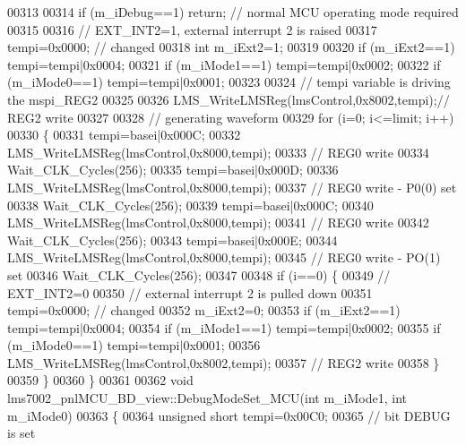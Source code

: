 \begin{DoxyCode}
{{{{{{{00313 
00314     \textcolor{keywordflow}{if} (m\_iDebug==1) \textcolor{keywordflow}{return}; \textcolor{comment}{// normal MCU operating mode required}
00315 
00316     \textcolor{comment}{// EXT\_INT2=1, external interrupt 2 is raised}
00317     tempi=0x0000;  \textcolor{comment}{// changed}
00318     \textcolor{keywordtype}{int} m\_iExt2=1;
00319 
00320     \textcolor{keywordflow}{if} (m\_iExt2==1)  tempi=tempi|0x0004;
00321     \textcolor{keywordflow}{if} (m\_iMode1==1) tempi=tempi|0x0002;
00322     \textcolor{keywordflow}{if} (m\_iMode0==1) tempi=tempi|0x0001;
00323 
00324     \textcolor{comment}{// tempi variable is driving the mspi\_REG2}
00325 
00326     LMS_WriteLMSReg(lmsControl,0x8002,tempi);\textcolor{comment}{// REG2 write}
00327 
00328     \textcolor{comment}{// generating waveform}
00329     \textcolor{keywordflow}{for} (i=0; i<=limit; i++)
00330     \{
00331         tempi=basei|0x000C;
00332                 LMS_WriteLMSReg(lmsControl,0x8000,tempi);
00333         \textcolor{comment}{// REG0 write}
00334         Wait_CLK_Cycles(256);
00335                 tempi=basei|0x000D;
00336                 LMS_WriteLMSReg(lmsControl,0x8000,tempi);
00337         \textcolor{comment}{// REG0 write  - P0(0) set}
00338         Wait_CLK_Cycles(256);
00339         tempi=basei|0x000C;
00340         LMS_WriteLMSReg(lmsControl,0x8000,tempi);
00341         \textcolor{comment}{// REG0 write}
00342         Wait_CLK_Cycles(256);
00343         tempi=basei|0x000E;
00344         LMS_WriteLMSReg(lmsControl,0x8000,tempi);
00345         \textcolor{comment}{// REG0 write - PO(1) set}
00346         Wait_CLK_Cycles(256);
00347 
00348         \textcolor{keywordflow}{if} (i==0) \{
00349             \textcolor{comment}{// EXT\_INT2=0}
00350             \textcolor{comment}{// external interrupt 2 is pulled down}
00351             tempi=0x0000; \textcolor{comment}{// changed}
00352             m\_iExt2=0;
00353             \textcolor{keywordflow}{if} (m\_iExt2==1)  tempi=tempi|0x0004;
00354             \textcolor{keywordflow}{if} (m\_iMode1==1) tempi=tempi|0x0002;
00355             \textcolor{keywordflow}{if} (m\_iMode0==1) tempi=tempi|0x0001;
00356             LMS_WriteLMSReg(lmsControl,0x8002,tempi);
00357             \textcolor{comment}{// REG2 write}
00358         \}
00359     \}
00360 \}
00361 
00362 \textcolor{keywordtype}{void} lms7002_pnlMCU_BD_view::DebugModeSet_MCU(\textcolor{keywordtype}{int} m_iMode1, \textcolor{keywordtype}{int} m_iMode0)
00363 \{
00364         \textcolor{keywordtype}{unsigned} \textcolor{keywordtype}{short} tempi=0x00C0;
00365         \textcolor{comment}{// bit DEBUG is set}
}}}}}}}
\end{DoxyCode}

